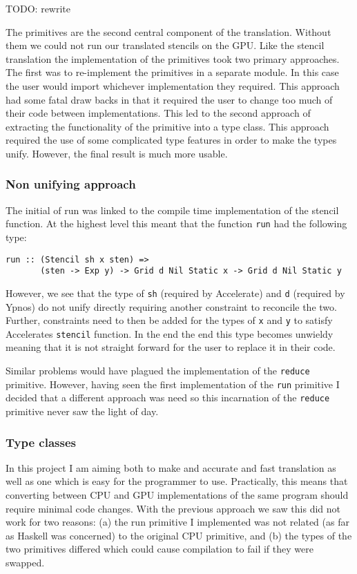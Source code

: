 TODO: rewrite

The primitives are the second central component of the translation.
Without them we could not run our translated stencils on the GPU. Like
the stencil translation the implementation of the primitives took two
primary approaches. The first was to re-implement the primitives in a
separate module. In this case the user would import whichever
implementation they required. This approach had some fatal draw backs in
that it required the user to change too much of their code between
implementations. This led to the second approach of extracting the
functionality of the primitive into a type class. This approach required
the use of some complicated type features in order to make the types
unify. However, the final result is much more usable.

\subsubsection{Non unifying approach}

The initial of run was linked to the compile time implementation of the
stencil function. At the highest level this meant that the function
\texttt{run} had the following type:

\begin{verbatim}
run :: (Stencil sh x sten) =>
       (sten -> Exp y) -> Grid d Nil Static x -> Grid d Nil Static y
\end{verbatim}

However, we see that the type of \texttt{sh} (required by Accelerate)
and \texttt{d} (required by Ypnos) do not unify directly requiring
another constraint to reconcile the two. Further, constraints need to
then be added for the types of \texttt{x} and \texttt{y} to satisfy
Accelerates \texttt{stencil} function. In the end the end this type
becomes unwieldy meaning that it is not straight forward for the user to
replace it in their code.

Similar problems would have plagued the implementation of the
\texttt{reduce} primitive. However, having seen the first implementation
of the \texttt{run} primitive I decided that a different approach was
need so this incarnation of the \texttt{reduce} primitive never saw the
light of day.

\subsubsection{Type classes}

In this project I am aiming both to make and accurate and fast
translation as well as one which is easy for the programmer to use.
Practically, this means that converting between CPU and GPU
implementations of the same program should require minimal code changes.
With the previous approach we saw this did not work for two reasons: (a)
the run primitive I implemented was not related (as far as Haskell was
concerned) to the original CPU primitive, and (b) the types of the two
primitives differed which could cause compilation to fail if they were
swapped.

